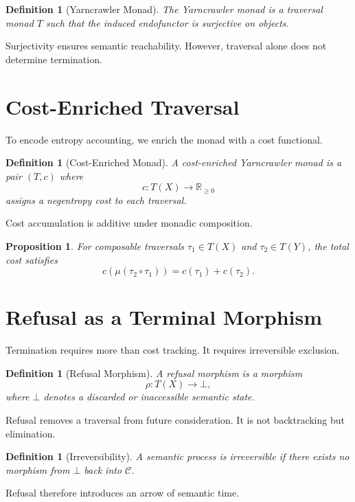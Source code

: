 \documentclass[12pt]{article}
\newtheorem{definition}[theorem]{Definition}
\newtheorem{proposition}[theorem]{Proposition}
\theoremstyle{remark}
\begin{document}
\begin{definition}[Yarncrawler Monad]
The Yarncrawler monad is a traversal monad $T$ such that the induced endofunctor is surjective on objects.
\end{definition}

Surjectivity ensures semantic reachability. However, traversal alone does not determine termination.

\section{Cost-Enriched Traversal}

To encode entropy accounting, we enrich the monad with a cost functional.

\begin{definition}[Cost-Enriched Monad]
A cost-enriched Yarncrawler monad is a pair $(T, c)$ where
\[
c : T(X) \to \mathbb{R}_{\ge 0}
\]
assigns a negentropy cost to each traversal.
\end{definition}

Cost accumulation is additive under monadic composition.

\begin{proposition}
For composable traversals $\tau_1 \in T(X)$ and $\tau_2 \in T(Y)$, the total cost satisfies
\[
c(\mu(\tau_2 \circ \tau_1)) = c(\tau_1) + c(\tau_2).
\]
\end{proposition}

\section{Refusal as a Terminal Morphism}

Termination requires more than cost tracking. It requires irreversible exclusion.

\begin{definition}[Refusal Morphism]
A refusal morphism is a morphism
\[
\rho : T(X) \to \bot,
\]
where $\bot$ denotes a discarded or inaccessible semantic state.
\end{definition}

Refusal removes a traversal from future consideration. It is not backtracking but elimination.

\begin{definition}[Irreversibility]
A semantic process is irreversible if there exists no morphism from $\bot$ back into $\mathcal{C}$.
\end{definition}

Refusal therefore introduces an arrow of semantic time.
\end{document}

